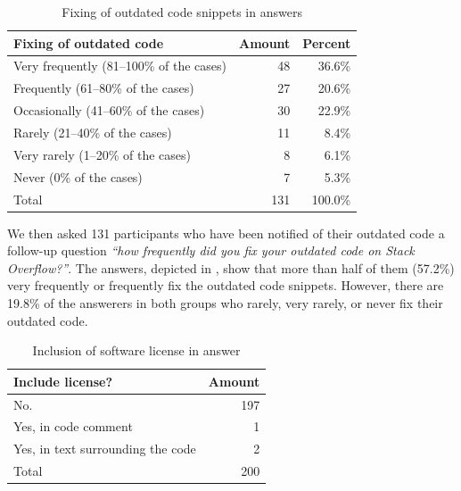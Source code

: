 \documentclass[10pt,journal,compsoc]{IEEEtran}
\begin{document}
\begin{table}
	\centering
	\caption{Fixing of outdated code snippets in answers}
	\label{tab:survey_code_snippet_outdated_fix}
	\begin{tabular}{lrr}
		\toprule
		Fixing of outdated code & Amount & Percent \\
		\midrule
		Very frequently (81--100\% of the cases) & 48 & 36.6\% \\
		Frequently (61--80\% of the cases) & 27 & 20.6\% \\
		Occasionally (41--60\% of the cases) & 30 & 22.9\% \\
		Rarely (21--40\% of the cases) & 11 & 8.4\% \\
		Very rarely (1--20\% of the cases) & 8 & 6.1\% \\
		Never (0\% of the cases) & 7 & 5.3\% \\
		\midrule
		Total & 131 & 100.0\% \\
		\bottomrule
	\end{tabular}
\end{table}

We then asked 131 participants who have been notified of their outdated code a
follow-up question \textit{``how frequently did you fix your outdated code on Stack
	Overflow?''}. The answers, depicted in
, show that more than half of them
(57.2\%) very frequently or frequently fix the outdated code snippets. However,
there are 19.8\% of the answerers in both groups who rarely, very rarely, or never fix 
their outdated code.
%


\begin{table}
	\centering
	\caption{Inclusion of software license in answer}
	\label{tab:survey_license_include}
	\begin{tabular}{lr}
		\toprule
		Include license? & Amount \\
		\midrule
		No. & 197 \\
		Yes, in code comment &	1 \\
		Yes, in text surrounding the code & 2 \\
		\midrule
		Total & 200 \\
		\bottomrule
	\end{tabular}
\end{table}
\end{document}
